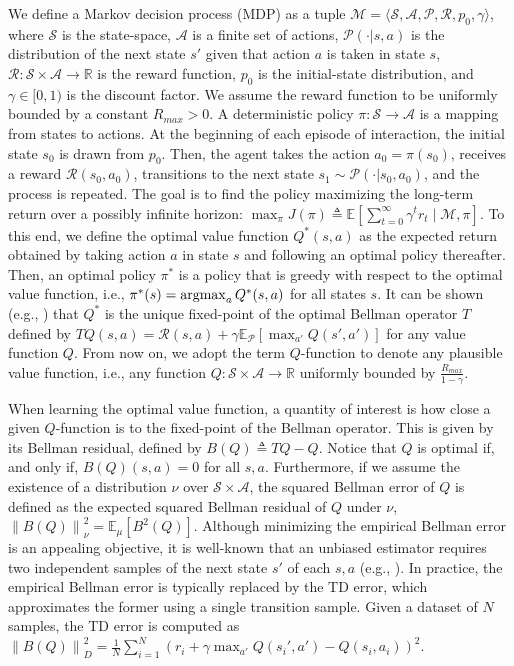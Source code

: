 \documentclass{article}
\newcommand{\argmax}{\operatornamewithlimits{argmax}}
\newcommand{\norm}[1]{\left\lVert #1 \right\rVert}
\begin{document}
We define a Markov decision process (MDP) as a tuple $\mathcal{M} = \langle \mathcal{S},\mathcal{A},\mathcal{P},\mathcal{R},p_0,\gamma\rangle$, where $\mathcal{S}$ is the state-space, $\mathcal{A}$ is a finite set of actions, $\mathcal{P}(\cdot | s,a)$ is the distribution of the next state $s'$ given that action $a$ is taken in state $s$, $\mathcal{R}: \mathcal{S}\times\mathcal{A}\rightarrow\mathbb{R}$ is the reward function, $p_0$ is the initial-state distribution, and $\gamma\in [0,1)$ is the discount factor. We assume the reward function to be uniformly bounded by a constant $R_{max}>0$. A deterministic policy $\pi : \mathcal{S} \rightarrow \mathcal{A}$ is a mapping from states to actions. At the beginning of each episode of interaction, the initial state $s_0$ is drawn from $p_0$. Then, the agent takes the action $a_0 = \pi(s_0)$, receives a reward $\mathcal{R}(s_0,a_0)$, transitions to the next state $s_1 \sim \mathcal{P}(\cdot | s_0,a_0)$, and the process is repeated. The goal is to find the policy maximizing the long-term return over a possibly infinite horizon: $\max_{\pi}J(\pi)\triangleq\mathbb{E}[\sum_{t=0}^{\infty} \gamma^t r_t \mid \mathcal{M},\pi]$. To this end, we define the optimal value function $Q^*(s,a)$ as the expected return obtained by taking action $a$ in state $s$ and following an optimal policy thereafter. Then, an optimal policy $\pi^*$ is a policy that is greedy with respect to the optimal value function, i.e., $\pi^*(s) = \argmax_a Q^*(s,a)$ for all states $s$. It can be shown (e.g., \cite{puterman1994markov}) that $Q^*$ is the unique fixed-point of the optimal Bellman operator $T$ defined by $TQ(s,a) = \mathcal{R}(s,a) + \gamma\mathbb{E}_{\mathcal{P}}[\max_{a'}Q(s',a')]$ for any value function $Q$. From now on, we adopt the term $Q$-function to denote any plausible value function, i.e., any function $Q : \mathcal{S}\times\mathcal{A} \rightarrow \mathbb{R}$ uniformly bounded by $\frac{R_{max}}{1-\gamma}$.

When learning the optimal value function, a quantity of interest is how close a given $Q$-function is to the fixed-point of the Bellman operator. This is given by its Bellman residual, defined by $B(Q) \triangleq TQ - Q$. Notice that $Q$ is optimal if, and only if, $B(Q)(s,a) = 0$ for all $s,a$. Furthermore, if we assume the existence of a distribution $\nu$ over $\mathcal{S}\times\mathcal{A}$, the squared Bellman error of $Q$ is defined as the expected squared Bellman residual of $Q$ under $\nu$, $\norm{B(Q)}_{\nu}^2=\mathbb{E}_{\mu}\left[ B^2(Q) \right]$. Although minimizing the empirical Bellman error is an appealing objective, it is well-known that an unbiased estimator requires two independent samples of the next state $s'$ of each $s,a$ (e.g., \cite{} ). In practice, the empirical Bellman error is typically replaced by the TD error, which approximates the former using a single transition sample. Given a dataset of $N$ samples, the TD error is computed as $\norm{B(Q)}_{D}^2 = \frac{1}{N}\sum_{i=1}^N (r_i + \gamma \max_{a'} Q(s_i',a') - Q(s_i,a_i))^2$.
\end{document}
